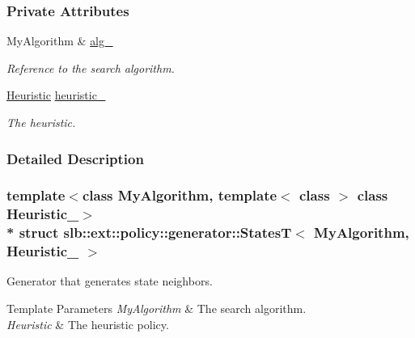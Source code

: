 \subsubsection*{Private Attributes}
\begin{DoxyCompactItemize}
\item 
My\+Algorithm \& \hyperlink{structslb_1_1ext_1_1policy_1_1generator_1_1StatesT_a3d265fd87949f2495d6bb278d7322d0a}{alg\+\_\+}\hypertarget{structslb_1_1ext_1_1policy_1_1generator_1_1StatesT_a3d265fd87949f2495d6bb278d7322d0a}{}\label{structslb_1_1ext_1_1policy_1_1generator_1_1StatesT_a3d265fd87949f2495d6bb278d7322d0a}

\begin{DoxyCompactList}\small\item\em Reference to the search algorithm. \end{DoxyCompactList}\item 
\hyperlink{structslb_1_1ext_1_1policy_1_1generator_1_1StatesT_a3d4d943f982860608b5bffd4afd20fae}{Heuristic} \hyperlink{structslb_1_1ext_1_1policy_1_1generator_1_1StatesT_ade63f5f9bca2aab0e926b11ab4a54e2d}{heuristic\+\_\+}\hypertarget{structslb_1_1ext_1_1policy_1_1generator_1_1StatesT_ade63f5f9bca2aab0e926b11ab4a54e2d}{}\label{structslb_1_1ext_1_1policy_1_1generator_1_1StatesT_ade63f5f9bca2aab0e926b11ab4a54e2d}

\begin{DoxyCompactList}\small\item\em The heuristic. \end{DoxyCompactList}\end{DoxyCompactItemize}


\subsubsection{Detailed Description}
\subsubsection*{template$<$class My\+Algorithm, template$<$ class $>$ class Heuristic\+\_\+$>$\\*
struct slb\+::ext\+::policy\+::generator\+::\+States\+T$<$ My\+Algorithm, Heuristic\+\_\+ $>$}

Generator that generates state neighbors. 


\begin{DoxyTemplParams}{Template Parameters}
{\em My\+Algorithm} & The search algorithm. \\
\hline
{\em Heuristic} & The heuristic policy. \\
\hline
\end{DoxyTemplParams}


